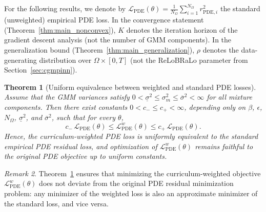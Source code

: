 \documentclass{article}
\theoremstyle{plain}
\newtheorem{theorem}{Theorem}[section]
\theoremstyle{definition}
\theoremstyle{remark}
\newtheorem{remark}[theorem]{Remark}
\begin{document}
For the following results, we denote by
$\mathcal{L}_{\mathrm{PDE}}(\theta)
=\frac{1}{N_\Omega}\sum_{i=1}^{N_\Omega}r_{\mathrm{PDE},i}^{2}$
the standard (unweighted) empirical PDE loss.
In the convergence statement (Theorem~\ref{thm:main_nonconvex}),
$K$ denotes the iteration horizon of the gradient descent analysis
(not the number of GMM components).
In the generalization bound (Theorem~\ref{thm:main_generalization}),
$\rho$ denotes the data-generating distribution over
$\Omega\times[0,T]$ (not the ReLoBRaLo parameter from
Section~\ref{sec:cgmpinn}).

\begin{theorem}[Uniform equivalence between weighted and standard PDE losses]
	\label{thm:main_equiv}
	Assume that the GMM variances satisfy
	$0<\underline{\sigma}^2\leqslant \sigma_m^2\leqslant \overline{\sigma}^2<\infty$
	for all mixture components.
	Then there exist constants $0<c_-\leqslant c_+<\infty$, depending only on
	$\beta$, $\epsilon$, $N_\Omega$, $\underline{\sigma}^2$, and
	$\overline{\sigma}^2$, such that for every $\theta$,
	\begin{equation}
		c_-\,\mathcal{L}_{\mathrm{PDE}}(\theta)
		\leqslant
		\mathcal{L}_{\mathrm{PDE}}^{w}(\theta)
		\leqslant
		c_+\,\mathcal{L}_{\mathrm{PDE}}(\theta).
		\label{eq:main_loss_equiv}
	\end{equation}
	Hence, the curriculum-weighted PDE loss is uniformly equivalent to the
	standard empirical PDE residual loss, and optimization of
	$\mathcal{L}_{\mathrm{PDE}}^{w}(\theta)$ remains faithful to the
	original PDE objective up to uniform constants.
\end{theorem}

\begin{remark}
	Theorem~\ref{thm:main_equiv} ensures that minimizing the curriculum-weighted objective $\mathcal{L}_{\mathrm{PDE}}^{w}(\theta)$ does not deviate from the original PDE residual minimization problem: any minimizer of the weighted loss is also an approximate minimizer of the standard loss, and vice versa.
\end{remark}
\end{document}
